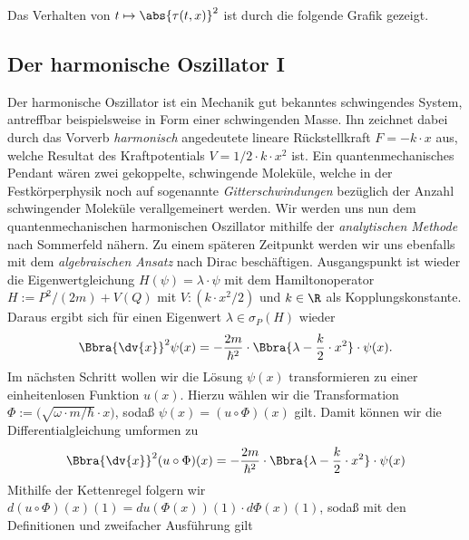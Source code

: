 \documentclass{subfiles}
\begin{document}
    Das Verhalten von $t\mapsto \abs{\tau(t,x)}^2$ ist durch die folgende Grafik gezeigt.
    \begin{figure}[H]
        \centering
    \end{figure}

    \subsection{Der harmonische Oszillator I}
    Der harmonische Oszillator ist ein Mechanik gut bekanntes schwingendes System, antreffbar beispielsweise in Form einer schwingenden Masse. Ihn zeichnet dabei durch das Vorverb \emph{harmonisch} angedeutete lineare Rückstellkraft $F = -k\cdot x$ aus, welche Resultat des Kraftpotentials $V = 1/2\cdot k\cdot x^2$ ist. Ein quantenmechanisches Pendant wären zwei gekoppelte, schwingende Moleküle, welche in der Festkörperphysik noch auf sogenannte \emph{Gitterschwindungen} bezüglich der Anzahl schwingender Moleküle verallgemeinert werden. Wir werden uns nun dem quantenmechanischen harmonischen Oszillator mithilfe der \emph{analytischen Methode} nach Sommerfeld nähern. Zu einem späteren Zeitpunkt werden wir uns ebenfalls mit dem \emph{algebraischen Ansatz} nach Dirac beschäftigen. Ausgangspunkt ist wieder die Eigenwertgleichung $H(\psi) = \lambda\cdot\psi$ mit dem Hamiltonoperator $H := P^2/(2m) + V(Q)$ mit $V:(k\cdot x^2/2)$ und $k\in\R$ als Kopplungskonstante. Daraus ergibt sich für einen Eigenwert $\lambda\in\sigma_P(H)$ wieder
    \[
        \Bbra{\dv{x}}^2\psi(x) = -\frac{2m}{\hbar^2}\cdot\Bbra{\lambda - \frac{k}{2}\cdot x^2}\cdot\psi(x).
    \]
    Im nächsten Schritt wollen wir die Lösung $\psi(x)$ transformieren zu einer einheitenlosen Funktion $u(x)$. Hierzu wählen wir die Transformation $\Phi:=\bigl(\sqrt{\omega\cdot m/\hbar}\cdot x\bigr)$, sodaß $\psi(x) = (u\circ \Phi)(x)$ gilt. Damit können wir die Differentialgleichung umformen zu
    \[
        \Bbra{\dv{x}}^2(u\circ\Phi)(x) = -\frac{2m}{\hbar^2}\cdot\Bbra{\lambda - \frac{k}{2}\cdot x^2}\cdot\psi(x)
    \]
    Mithilfe der Kettenregel folgern wir $d(u\circ\Phi)(x)(1) = du(\Phi(x))(1)\cdot d\Phi(x)(1)$, sodaß mit den Definitionen und zweifacher Ausführung gilt
\end{document}
